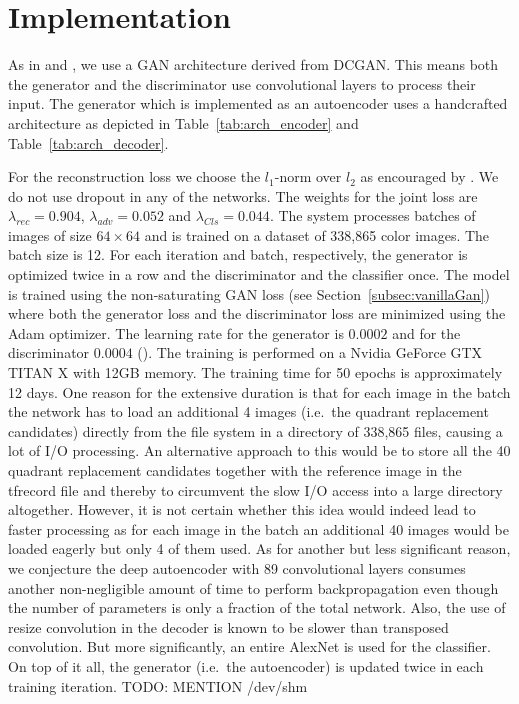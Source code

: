 \documentclass[a4paper,12pt]{report}
\begin{document}
\section{Implementation}\label{subsec:implementation}
As in \cite{DisentFacOfVarByMixTh} and \cite{InfoGAN}, we use a GAN architecture derived from DCGAN. This means both the generator and the discriminator use convolutional layers to process their input. The generator which is implemented as an autoencoder uses a handcrafted architecture as depicted in Table~\ref{tab:arch_encoder} and Table~\ref{tab:arch_decoder}.


For the reconstruction loss we choose the $l_1$-norm over $l_2$ as encouraged by \cite{CondGAN_PatchGAN}. We do not use dropout in any of the networks. The weights for the joint loss are $ \lambda_{rec} = 0.904$, $\lambda_{adv} = 0.052$ and $ \lambda_{Cls} = 0.044$. The system processes batches of images of size $64 \times 64$ and is trained on a dataset of 338,865 color images. The batch size is 12. For each iteration and batch, respectively, the generator is optimized twice in a row and the discriminator and the classifier once. The model is trained using the non-saturating GAN loss (see Section~\ref{subsec:vanillaGan}) where both the generator loss and the discriminator loss are minimized using the Adam optimizer. The learning rate for the generator is $0.0002$ and for the discriminator $0.0004$ (\cite{TTUR}). The training is performed on a Nvidia GeForce GTX TITAN X with 12GB memory. The training time for 50 epochs is approximately 12 days. One reason for the extensive duration is that for each image in the batch the network has to load an additional 4 images (i.e.\ the quadrant replacement candidates) directly from the file system in a directory of 338,865 files, causing a lot of I/O processing. An alternative approach to this would be to store all the 40 quadrant replacement candidates together with the reference image in the tfrecord file and thereby to circumvent the slow I/O access into a large directory altogether. However, it is not certain whether this idea would indeed lead to faster processing as for each image in the batch an additional 40 images would be loaded eagerly but only 4 of them used. As for another but less significant reason, we conjecture the deep autoencoder with 89 convolutional layers consumes another non-negligible amount of time to perform backpropagation even though the number of parameters is only a fraction of the total network. Also, the use of resize convolution in the decoder is known to be slower than transposed convolution. But more significantly, an entire AlexNet is used for the classifier. On top of it all, the generator (i.e.\ the autoencoder) is updated twice in each training iteration. TODO: MENTION /dev/shm
\end{document}
